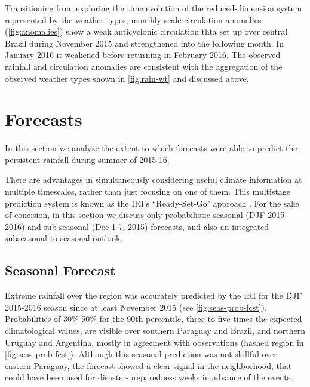 \documentclass[twocol]{ametsoc}
\begin{document}
Transitioning from exploring the time evolution of the reduced-dimension system represented by the weather types, monthly-scale circulation anomalies (\cref{fig:anomalies}) show a weak anticyclonic circulation thta set up over central Brazil during November 2015 and strengthened into the following month.
In January 2016 it weakened before returning in February 2016.
The observed rainfall and circulation anomalies are consistent with the aggregation of the observed weather types shown in \cref{fig:rain-wt} and discussed above.



\section{Forecasts} \label{sec:fcsts}

In this section we analyze the extent to which forecasts were able to predict the persistent rainfall during summer of 2015-16.

There are advantages in simultaneously considering useful climate information at multiple timescales, rather than just focusing on one of them.
This multistage prediction system is known as the IRI's ``Ready-Set-Go" approach \citep{Goddard:2014kf,Munoz2016}.
For the sake of concision, in this section we discuss only probabilistic seasonal (DJF 2015-2016) and sub-seasonal (Dec 1-7, 2015) forecasts, and also an integrated subseasonal-to-seasonal outlook.

\subsection{Seasonal Forecast}

Extreme rainfall over the region was accurately predicted by the IRI for the DJF 2015-2016 season since at least November 2015 (see \cref{fig:seas-prob-fcst}). Probabilities of 30\%-50\% for the 90th percentile, three to five times the expected climatological values, are visible over southern Paraguay and Brazil, and northern Uruguay and Argentina, mostly in agreement with observations (hashed region in \cref{fig:seas-prob-fcst}).
Although this seasonal prediction was not skillful over eastern Paraguay, the forecast  showed a clear signal in the neighborhood, that could have been used for disaster-preparedness weeks in advance of the events.
\end{document}
